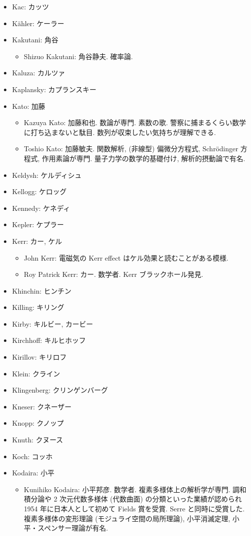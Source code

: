 \documentclass[openany, a4paper, oneside]{jsbook}
\begin{document}
\begin{itemize}
\item Kac: カッツ
\item K\"ahler: ケーラー
\item Kakutani: 角谷
\begin{itemize}
\item Shizuo Kakutani: 角谷静夫. 確率論.
\end{itemize}
\item Kaluza: カルツァ
\item Kaplansky: カプランスキー
\item Kato: 加藤
\begin{itemize}
\item Kazuya Kato: 加藤和也. 数論が専門. 素数の歌. 警察に捕まるくらい数学に打ち込まないと駄目. 数列が収束したい気持ちが理解できる.
\item Toshio Kato: 加藤敏夫. 関数解析, (非線型) 偏微分方程式, Schr\"odinger 方程式, 作用素論が専門. 量子力学の数学的基礎付け, 解析的摂動論で有名.
\end{itemize}
\item Keldysh: ケルディシュ
\item Kellogg: ケロッグ
\item Kennedy: ケネディ
\item Kepler: ケプラー
\item Kerr: カー, ケル
\begin{itemize}
\item John Kerr: 電磁気の Kerr effect はケル効果と読むことがある模様.
\item Roy Patrick Kerr: カー. 数学者. Kerr ブラックホール発見.
\end{itemize}
\item Khinchin: ヒンチン
\item Killing: キリング
\item Kirby: キルビー, カービー
\item Kirchhoff: キルヒホッフ
\item Kirillov: キリロフ
\item Klein: クライン
\item Klingenberg: クリンゲンバーグ
\item Kneser: クネーザー
\item Knopp: クノップ
\item Knuth: クヌース
\item Koch: コッホ
\item Kodaira: 小平
\begin{itemize}
\item Kunihiko Kodaira: 小平邦彦. 数学者. 複素多様体上の解析学が専門. 調和積分論や 2 次元代数多様体 (代数曲面) の分類といった業績が認められ 1954 年に日本人として初めて Fields 賞を受賞. Serre と同時に受賞した. 複素多様体の変形理論 (モジュライ空間の局所理論), 小平消滅定理, 小平・スペンサー理論が有名.

\end{itemize}
\end{itemize}
\end{document}
